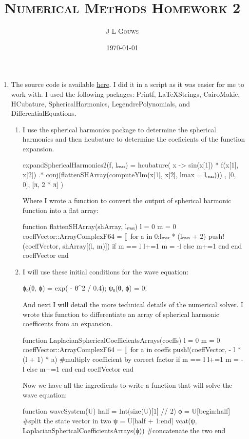 \documentclass[12pt,a4]{article}
\title{
\textsc{Numerical Methods Homework 2}
}
\author{\textsc{J L Gouws}
}
\date{\today
\\[1cm]}
\begin{document}
\thispagestyle{empty}

\maketitle

\begin{enumerate}
  \item
    The source code is available \href{https://github.com/JLGouws/PSINumericalMethodsHomework2}{here}. I did it in a script as it was easier for me to work with.
    I used the following packages: 
Printf,
LaTeXStrings,
CairoMakie, 
HCubature, 
SphericalHarmonics, 
LegendrePolynomials, and
DifferentialEquations.

    \begin{enumerate}
      \item
        I use the spherical harmonics package to determine the spherical harmonics and then hcubature to determine the coeficients of the function expansion.
\begin{jllisting}
expandSphericalHarmonics2(f, lₘₐₓ) = hcubature(
  x -> sin(x[1]) * f(x[1], x[2]) .* conj(flattenSHArray(computeYlm(x[1], x[2], lmax = lₘₐₓ)))
  , [0, 0], [π, 2 * π]
)
\end{jllisting}
  Where I wrote a function to convert the output of spherical harmonic function into a flat array:
\begin{jllisting}
function flattenSHArray(shArray, lₘₐₓ)
  l = 0
  m = 0
  coeffVector::Array{ComplexF64} = []
  for a in 0:lₘₐₓ * (lₘₐₓ + 2)
    push!(coeffVector, shArray[(l, m)])
    if m == l
      l+=1
      m = -l
    else
      m+=1
    end
  end
  coeffVector
end
\end{jllisting}
\item
  I will use these initial conditions for the wave equation:

\begin{jllisting}
  ϕ₀(θ, ϕ) = exp( - θ^2 / 0.4);
  ψ₀(θ, ϕ) = 0;
\end{jllisting}
And next I will detail the more technical details of the numerical solver.
I wrote this function to differentiate an array of spherical harmonic coefficents from an expansion.
\begin{jllisting}
function LaplacianSphericalCoefficientsArrays(coeffs)
  l = 0
  m = 0
  coeffVector::Array{ComplexF64} = []
  for a in coeffs
    push!(coeffVector, - l * (l + 1) * a) #multiply coefficient by correct factor
    if m == l
      l+=1
      m = -l
    else
      m+=1
    end
  end
  coeffVector
end
\end{jllisting}
        Now we have all the ingredients to write a function that will solve the wave equation:
\begin{jllisting}
function waveSystem(U)
    half = Int(size(U)[1] // 2)
    ϕ = U[begin:half] #split the state vector in two
    ψ = U[half + 1:end]    
    vcat(ψ, LaplacianSphericalCoefficientsArrays(ϕ)) #concatenate the two
end


\end{jllisting}
\end{enumerate}
\end{enumerate}
\end{document}
